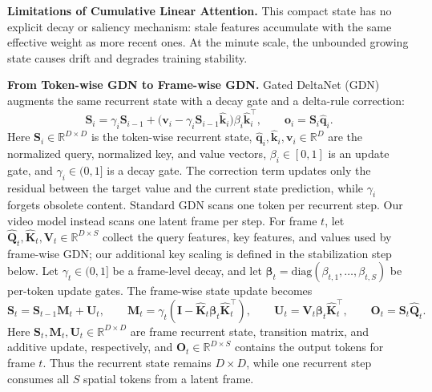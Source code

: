 \noindent \textbf{Limitations of Cumulative Linear Attention.}
This compact state has no explicit decay or saliency mechanism: stale features accumulate with the same effective weight as more recent ones. At the minute scale, the unbounded growing state causes drift and degrades training stability.

\noindent \textbf{From Token-wise GDN to Frame-wise GDN.}
Gated DeltaNet (GDN)~\citep{gated_deltanet} augments the same recurrent state with a decay gate and a delta-rule correction:
\begin{equation}
\label{eq:token_gdn}
\mathbf{S}_i
=\gamma_i\mathbf{S}_{i-1}
+\big(\mathbf{v}_i-\gamma_i\mathbf{S}_{i-1}\hat{\mathbf{k}}_i\big)\beta_i\hat{\mathbf{k}}_i^\top,
\qquad
\mathbf{o}_i=\mathbf{S}_i\hat{\mathbf{q}}_i .
\end{equation}
Here $\mathbf{S}_i\in\mathbb{R}^{D\times D}$ is the token-wise recurrent state, $\hat{\mathbf{q}}_i,\hat{\mathbf{k}}_i,\mathbf{v}_i\in\mathbb{R}^{D}$ are the normalized query, normalized key, and value vectors, $\beta_i\in[0,1]$ is an update gate, and $\gamma_i\in(0,1]$ is a decay gate.
The correction term updates only the residual between the target value and the current state prediction, while $\gamma_i$ forgets obsolete content.
Standard GDN scans one token per recurrent step.
Our video model instead scans one latent frame per step.
For frame $t$, let $\hat{\mathbf{Q}}_t,\hat{\mathbf{K}}_t,\mathbf{V}_t\in\mathbb{R}^{D\times S}$ collect the query features, key features, and values used by frame-wise GDN; our additional key scaling is defined in the stabilization step below.
Let $\gamma_t\in(0,1]$ be a frame-level decay, and let $\boldsymbol{\beta}_t=\mathrm{diag}(\beta_{t,1},\ldots,\beta_{t,S})$ be per-token update gates.
The frame-wise state update becomes
\begin{equation}
\label{eq:frame_gdn}
\mathbf{S}_t
=\mathbf{S}_{t-1}\mathbf{M}_t+\mathbf{U}_t,\qquad
\mathbf{M}_t=\gamma_t\!\left(\mathbf{I}-\hat{\mathbf{K}}_t\boldsymbol{\beta}_t\hat{\mathbf{K}}_t^\top\right),\qquad
\mathbf{U}_t=\mathbf{V}_t\boldsymbol{\beta}_t\hat{\mathbf{K}}_t^\top,\qquad
\mathbf{O}_t=\mathbf{S}_t\hat{\mathbf{Q}}_t .
\end{equation}
Here $\mathbf{S}_t,\mathbf{M}_t,\mathbf{U}_t\in\mathbb{R}^{D\times D}$ are frame recurrent state, transition matrix, and additive update, respectively, and $\mathbf{O}_t\in\mathbb{R}^{D\times S}$ contains the output tokens for frame $t$.
Thus the recurrent state remains $D\times D$, while one recurrent step consumes all $S$ spatial tokens from a latent frame.

